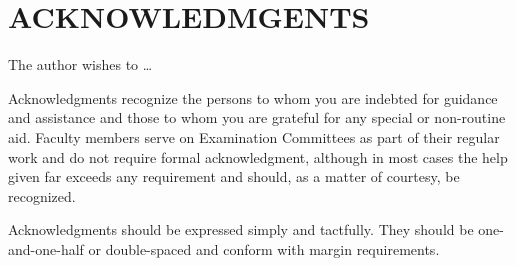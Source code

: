 \newpage
\chapter*{ACKNOWLEDMGENTS}
\thispagestyle{plain}
The author wishes to \dots

Acknowledgments recognize the persons to whom you are indebted for guidance and assistance and those to whom you are grateful for any special or non-routine aid. Faculty members serve on Examination Committees as part of their regular work and do not require formal acknowledgment, although in most cases the help given far exceeds any requirement and should, as a matter of courtesy, be recognized.

Acknowledgments should be expressed simply and tactfully. They should be one-and-one-half or double-spaced and conform with margin requirements.